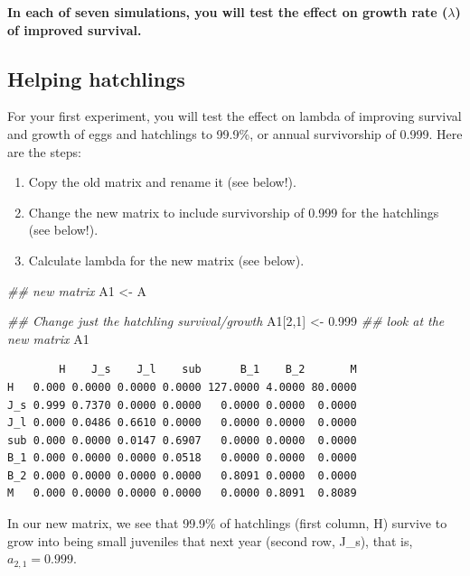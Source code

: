 \documentclass[
  letterpaper,
  DIV=11,
  numbers=noendperiod]{scrreprt}
\newenvironment{Shaded}{\begin{snugshade}}{\end{snugshade}}
\newcommand{\DecValTok}[1]{\textcolor[rgb]{0.68,0.00,0.00}{#1}}
\newcommand{\DocumentationTok}[1]{\textcolor[rgb]{0.37,0.37,0.37}{\textit{#1}}}
\newcommand{\FloatTok}[1]{\textcolor[rgb]{0.68,0.00,0.00}{#1}}
\newcommand{\NormalTok}[1]{\textcolor[rgb]{0.00,0.23,0.31}{#1}}
\newcommand{\OtherTok}[1]{\textcolor[rgb]{0.00,0.23,0.31}{#1}}
\providecommand{\tightlist}{%
  \setlength{\itemsep}{0pt}\setlength{\parskip}{0pt}}
\begin{document}
\textbf{In each of seven simulations, you will test the effect on growth
rate (\(\lambda\)) of improved survival.}

\subsection{Helping hatchlings}\label{helping-hatchlings}

For your first experiment, you will test the effect on lambda of
improving survival and growth of eggs and hatchlings to 99.9\%, or
annual survivorship of 0.999. Here are the steps:

\begin{enumerate}
\def\labelenumi{\arabic{enumi}.}
\tightlist
\item
  Copy the old matrix and rename it (see below!).
\item
  Change the new matrix to include survivorship of 0.999 for the
  hatchlings (see below!).
\item
  Calculate lambda for the new matrix (see below).
\end{enumerate}

\begin{Shaded}
\begin{Highlighting}[]
\DocumentationTok{\#\# new matrix }
\NormalTok{A1 }\OtherTok{\textless{}{-}}\NormalTok{ A }

\DocumentationTok{\#\# Change just the hatchling survival/growth}
\NormalTok{A1[}\DecValTok{2}\NormalTok{,}\DecValTok{1}\NormalTok{] }\OtherTok{\textless{}{-}} \FloatTok{0.999}
\DocumentationTok{\#\# look at the new matrix}
\NormalTok{A1}
\end{Highlighting}
\end{Shaded}

\begin{verbatim}
        H    J_s    J_l    sub      B_1    B_2       M
H   0.000 0.0000 0.0000 0.0000 127.0000 4.0000 80.0000
J_s 0.999 0.7370 0.0000 0.0000   0.0000 0.0000  0.0000
J_l 0.000 0.0486 0.6610 0.0000   0.0000 0.0000  0.0000
sub 0.000 0.0000 0.0147 0.6907   0.0000 0.0000  0.0000
B_1 0.000 0.0000 0.0000 0.0518   0.0000 0.0000  0.0000
B_2 0.000 0.0000 0.0000 0.0000   0.8091 0.0000  0.0000
M   0.000 0.0000 0.0000 0.0000   0.0000 0.8091  0.8089
\end{verbatim}

In our new matrix, we see that 99.9\% of hatchlings (first column, H)
survive to grow into being small juveniles that next year (second row,
J\_s), that is, \(a_{2,1} = 0.999\).
\end{document}
